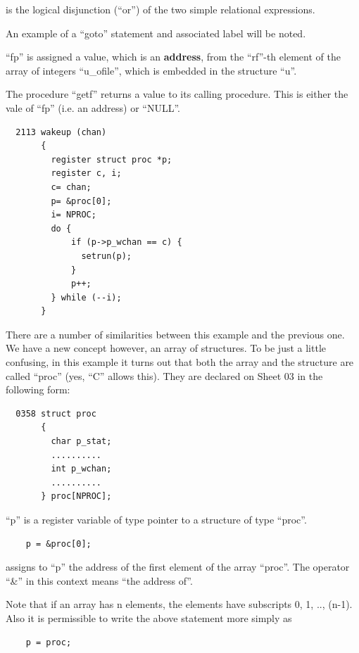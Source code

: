 \noindent is the logical disjunction (``or'') of
the two simple relational expressions.

An example of a ``goto'' statement and
associated label will be noted.


``fp'' is assigned a value, which is an
{\bf address}, from the ``rf''-th element of
the array of integers ``u\_ofile'', which
is embedded in the structure ``u''.


The procedure ``getf'' returns a value to
its calling procedure. This is either
the vale of ``fp'' (i.e. an address) or
``NULL''.


\begin{verbatim}
  2113 wakeup (chan)
       {
         register struct proc *p;
         register c, i;
         c= chan;
         p= &proc[0];
         i= NPROC;
         do {
             if (p->p_wchan == c) {
               setrun(p);
             }
             p++;
         } while (--i);
       }
\end{verbatim}

There are a number of similarities
between this example and the previous
one. We have a new concept however, an
array of structures. To be just a
little confusing, in this example it
turns out that both the array and the
structure are called ``proc'' (yes, ``C''
allows this). They are declared on
Sheet 03 in the following form:

\begin{verbatim}
  0358 struct proc
       {
         char p_stat;
         ..........
         int p_wchan;
         ..........
       } proc[NPROC];
\end{verbatim}

``p'' is a register variable of type
pointer to a structure of type ``proc''.

\begin{verbatim}
    p = &proc[0];
\end{verbatim}


\noindent assigns to ``p'' the address of the first
element of the array ``proc''. The
operator ``\&'' in this context means ``the
address of''.


Note that if an array has n elements,
the elements have subscripts 0, 1, .., (n-1).
Also it is permissible to write
the above statement more simply as

\begin{verbatim}
    p = proc;
\end{verbatim}

